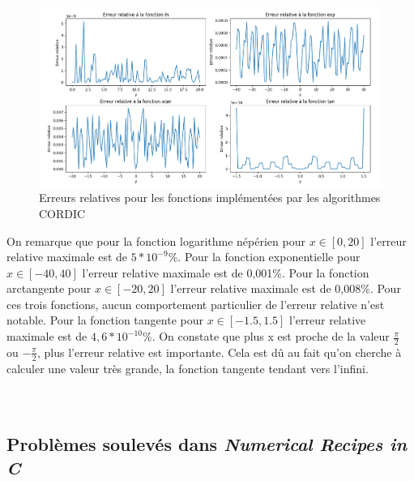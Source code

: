 \documentclass{article}
\begin{document}
\begin{figure}[h]
    \centering
    \centerline{\includegraphics[width=18cm]{Figure_2.png}}
    \caption{Erreurs relatives pour les fonctions implémentées par les algorithmes CORDIC}
    \label{CORDIC}
\end{figure}
On remarque que pour la fonction logarithme népérien pour $x\in[0,20]$ l'erreur relative maximale est de $5*10^{-9}\%$.
Pour la fonction exponentielle  pour $x\in[-40,40]$ l'erreur relative maximale est de 0,001\%.
Pour la fonction arctangente pour $x\in[-20,20]$ l'erreur relative maximale est de 0,008\%.
Pour ces trois fonctions, aucun comportement particulier de l'erreur relative n'est notable. 
Pour la fonction tangente pour $x\in[-1.5,1.5]$ l'erreur relative maximale est de $4,6*10^{-10}\%$. On constate que plus x est proche de la valeur $\frac{\pi}{2}$ ou $-\frac{\pi}{2}$, plus l'erreur relative est importante. Cela est dû au fait qu'on cherche à calculer une valeur très grande, la fonction tangente tendant vers l'infini. 
\\
\\
\\
\subsection{Problèmes soulevés dans \textit{Numerical Recipes in C}}
\end{document}

